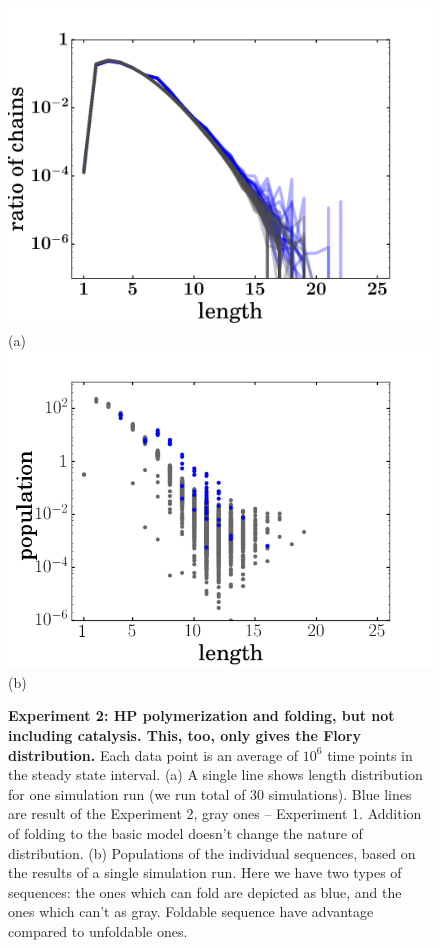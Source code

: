 \documentclass[journal=jacsat,manuscript=article,layout=twocolumn]{achemso}
\begin{document}
\begin{figure}[hbt!]
  \centering
  \includegraphics[width=0.9\columnwidth]{pictures/distr-folded-many.pdf} (a)
   \includegraphics[width=0.9\columnwidth]{pictures/scatter2009.png}(b)
  \caption{\footnotesize{\textbf{Experiment 2: HP polymerization and folding, but not 
including catalysis.  This, too, only gives the Flory distribution.}  Each data point is an 
average of $10^6$ time points in the steady state interval. (a) 
A single line shows length distribution for one simulation run (we run total of 30 simulations). 
Blue lines are result of the Experiment 2, gray ones -- Experiment 1. Addition of folding to the 
basic model doesn't change the nature of distribution. (b) Populations of the individual 
sequences, 
based on the results of a single simulation run. Here we have two types of sequences: the ones 
which can fold are depicted as blue, and the ones which can't as gray. Foldable sequence have 
advantage compared 
to unfoldable ones.}}
  \label{fig:sim.flory-fold}
\end{figure}
\end{document}
